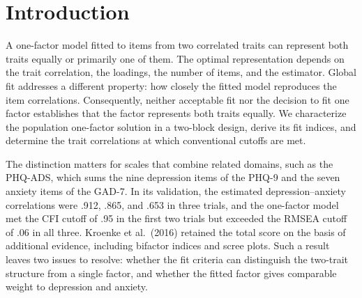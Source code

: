 \begin{abstract}
A one-factor model fitted to items from two correlated traits need not represent both traits equally. We characterize its population maximum likelihood solution and derive the resulting fit indices. For two equal blocks of $m$ items with loading $\lambda$, the optimal solution represents an equal composite when the trait correlation is at least $\varphi^* = (1 + (m-1)\lambda^2)/(m(2-\lambda^2))$. Below this threshold, two equally good solutions favor different traits; at zero correlation, each represents one trait alone. For this design, we establish global optimality over the unrestricted one-factor model and extend the analysis to unequal blocks and least-squares estimation. The solutions give exact population CFI, TLI, RMSEA, and SRMR, including the trait correlations at which conventional cutoffs are met. With loadings of .7 and 4 to 16 items in total, CFI reaches .95 at correlations of .78 to .84, although two traits generate the data. Numerical studies examine binary and ordinal items and finite samples. They also show that item order can change the solution returned by lavaan's default starting values. The results provide design-specific benchmarks for interpreting one-factor fit and for assessing which traits the fitted factor represents.
\par\medskip
\noindent\textbf{Keywords:} factor analysis, fit indices, model misspecification, unidimensionality, symmetry breaking
\end{abstract}

\section{Introduction}
\label{sec:introduction}

A one-factor model fitted to items from two correlated traits can represent both traits equally or primarily one of them. The optimal representation depends on the trait correlation, the loadings, the number of items, and the estimator. Global fit addresses a different property: how closely the fitted model reproduces the item correlations. Consequently, neither acceptable fit nor the decision to fit one factor establishes that the factor represents both traits equally. We characterize the population one-factor solution in a two-block design, derive its fit indices, and determine the trait correlations at which conventional cutoffs are met.

The distinction matters for scales that combine related domains, such as the PHQ-ADS, which sums the nine depression items of the PHQ-9 and the seven anxiety items of the GAD-7. In its validation, the estimated depression--anxiety correlations were .912, .865, and .653 in three trials, and the one-factor model met the CFI cutoff of .95 in the first two trials but exceeded the RMSEA cutoff of .06 in all three. Kroenke et al.\ (2016) retained the total score on the basis of additional evidence, including bifactor indices and scree plots. Such a result leaves two issues to resolve: whether the fit criteria can distinguish the two-trait structure from a single factor, and whether the fitted factor gives comparable weight to depression and anxiety.

